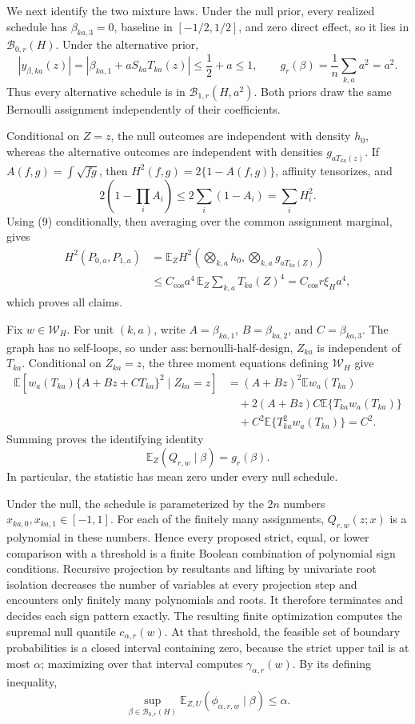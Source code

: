 We next identify the two mixture laws.  Under the null prior, every realized schedule has \(\beta_{ka,3}=0\), baseline in \([-1/2,1/2]\), and zero direct effect, so it lies in \(\mathcal B_{0,r}(H)\).  Under the alternative prior,
\[
|y_{\beta,ka}(z)|=|\beta_{ka,1}+aS_{ka}T_{ka}(z)|\le\frac12+a\le1,
\qquad
g_r(\beta)=\frac1n\sum_{k,a}a^2=a^2.
\]
Thus every alternative schedule is in \(\mathcal B_{1,r}(H,a^2)\).  Both priors draw the same Bernoulli assignment independently of their coefficients.

Conditional on \(Z=z\), the null outcomes are independent with density \(h_0\), whereas the alternative outcomes are independent with densities \(g_{aT_{ka}(z)}\).  If \(A(f,g)=\int\sqrt{fg}\), then \(H^2(f,g)=2\{1-A(f,g)\}\), affinity tensorizes, and
\[
2\left(1-\prod_iA_i\right)\le2\sum_i(1-A_i)=\sum_iH_i^2.
\]
Using (9) conditionally, then averaging over the common assignment marginal, gives
\[
\begin{aligned}
H^2(P_{0,a},P_{1,a})
&=\mathbb E_Z H^2\left(\bigotimes_{k,a}h_0,
\bigotimes_{k,a}g_{aT_{ka}(Z)}\right)\\
&\le C_{\cos}a^4\,
\mathbb E_Z\sum_{k,a}T_{ka}(Z)^4
=C_{\cos}r\xi_Ha^4,
\end{aligned}
\]
which proves all claims.

Fix \(w\in\mathcal W_H\).  For unit \((k,a)\), write \(A=\beta_{ka,1}\), \(B=\beta_{ka,2}\), and \(C=\beta_{ka,3}\).  The graph has no self-loops, so under \(\mathrm{ass:bernoulli\text{-}half\text{-}design}\), \(Z_{ka}\) is independent of \(T_{ka}\).  Conditional on \(Z_{ka}=z\), the three moment equations defining \(\mathcal W_H\) give
\[
\begin{aligned}
\mathbb E\left[w_a(T_{ka})\{A+Bz+CT_{ka}\}^2\mid Z_{ka}=z\right]
&=(A+Bz)^2\mathbb Ew_a(T_{ka})\\
&\quad+2(A+Bz)C\mathbb E\{T_{ka}w_a(T_{ka})\}\\
&\quad+C^2\mathbb E\{T_{ka}^2w_a(T_{ka})\}=C^2.
\end{aligned}
\]
Summing proves the identifying identity
\[
\mathbb E_Z(Q_{r,w}\mid\beta)=g_r(\beta). \tag{10}
\]
In particular, the statistic has mean zero under every null schedule.

Under the null, the schedule is parameterized by the \(2n\) numbers \(x_{ka,0},x_{ka,1}\in[-1,1]\).  For each of the finitely many assignments, \(Q_{r,w}(z;x)\) is a polynomial in these numbers.  Hence every proposed strict, equal, or lower comparison with a threshold is a finite Boolean combination of polynomial sign conditions.  Recursive projection by resultants and lifting by univariate root isolation decreases the number of variables at every projection step and encounters only finitely many polynomials and roots.  It therefore terminates and decides each sign pattern exactly.  The resulting finite optimization computes the supremal null quantile \(c_{\alpha,r}(w)\).  At that threshold, the feasible set of boundary probabilities is a closed interval containing zero, because the strict upper tail is at most \(\alpha\); maximizing over that interval computes \(\gamma_{\alpha,r}(w)\).  By its defining inequality,
\[
\sup_{\beta\in\mathcal B_{0,r}(H)}
\mathbb E_{Z,U}(\phi_{\alpha,r,w}\mid\beta)\le\alpha. \tag{11}
\]

